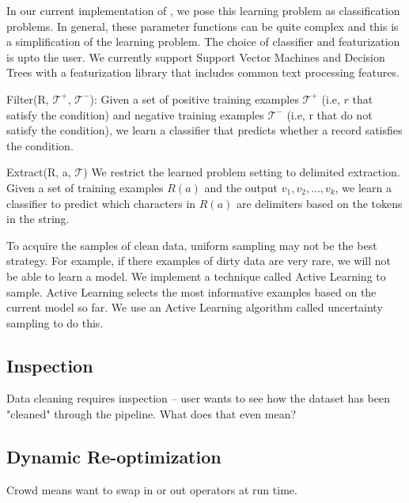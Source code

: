 In our current implementation of \projx, we pose this learning problem as classification problems.
In general, these parameter functions can be quite complex and this is a simplification of the learning problem.
The choice of classifier and featurization is upto the user. 
We currently support Support Vector Machines and Decision Trees with a featurization library that includes common text processing features.

\vspace{0.5em}

\noindent \textsf{Filter(R, $\mathcal{T}^+$, $\mathcal{T}^-$)}: Given a set of positive training examples $\mathcal{T}^+$ (i.e, $r$ that satisfy the condition) and
negative training examples $\mathcal{T}^-$ (i.e, r that do not satisfy the condition), we learn a classifier that predicts whether a record satisfies the condition. 

\vspace{0.5em}

\noindent \textsf{Extract(R, a, $\mathcal{T}$)} We restrict the learned problem setting to delimited extraction. Given a set of training examples $R(a)$ and the output $v_1,v_2,...,v_k$, we learn a classifier to predict which characters in $R(a)$ are delimiters based on the tokens in the string.

\vspace{1em}

To acquire the samples of clean data, uniform sampling may not be the best strategy.
For example, if there examples of dirty data are very rare, we will not be able to learn a model.
We implement a technique called Active Learning to sample.
Active Learning selects the most informative examples based on the current model so far.
We use an Active Learning algorithm called uncertainty sampling to do this.




\subsection{Inspection}

Data cleaning requires inspection -- user wants to see how the dataset
has been "cleaned"  through the pipeline.  What does that even mean?

\subsection{Dynamic Re-optimization}

Crowd means want to swap in or out operators at run time.



